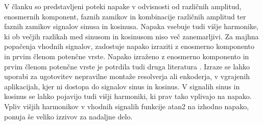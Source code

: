 \documentclass[a4paper]{article}
\begin{document}
V članku so predstavljeni poteki napake v odvisnosti od različnih amplitud, enosmernih komponent, faznih zamikov in kombinacije različnih amplitud ter faznih zamikov signalov sinusa in kosinusa. Napaka vsebuje tudi višje harmonike, ki ob večjih razlikah med sinusom in kosinusom niso več zanemarljivi. Za majhna popačenja vhodnih signalov, zadostuje napako izraziti z enosmerno komponento in prvim členom potenčne vrste. Napako izraženo z enosmerno komponento in prvim členom potenčne vrste je potrdila tudi druga literatura \cite{RLS1}. Izraze se lahko uporabi za ugotovitev nepravilne montaže resolverja ali enkoderja, v vgrajenih aplikacijah, kjer ni dostopa do signalov sinus in kosinus. V signalih sinus in kosinus se lahko pojavijo tudi višji harmoniki, ki prav tako vplivajo na napako. Vpliv višjih harmonikov v vhodnih signalih funkcije atan2 na izhodno napako, ponuja še veliko izzivov za nadaljne delo.
\end{document}
